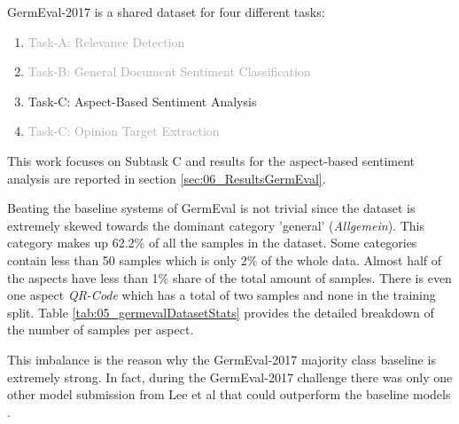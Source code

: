 GermEval-2017 is a shared dataset for four different tasks: 

\begin{enumerate}
	\item \textcolor{darkgray}{Task-A: Relevance Detection}
	\item \textcolor{darkgray}{Task-B: General Document Sentiment Classification}
	\item Task-C: Aspect-Based Sentiment Analysis
	\item \textcolor{darkgray}{Task-C: Opinion Target Extraction}
\end{enumerate}

This work focuses on Subtask C and results for the aspect-based sentiment analysis are reported in section \ref{sec:06_ResultsGermEval}.
\medskip

Beating the baseline systems of GermEval is not trivial since the dataset is extremely skewed towards the dominant category 'general' {(\textit{Allgemein})}. This category makes up 62.2\% of all the samples in the dataset. Some categories contain less than 50 samples which is only 2\% of the whole data. Almost half of the aspects have less than 1\% share of the total amount of samples. There is even one aspect \textit{QR-Code} which has a total of two samples and none in the training split. Table \ref{tab:05_germevalDatasetStats} provides the detailed breakdown of the number of samples per aspect.

This imbalance is the reason why the GermEval-2017 majority class baseline is extremely strong. In fact, during the GermEval-2017 challenge there was only one other model submission from Lee et al \cite{Lee2017} that could outperform the baseline models \cite{Wojatzki2017}.
\medskip

